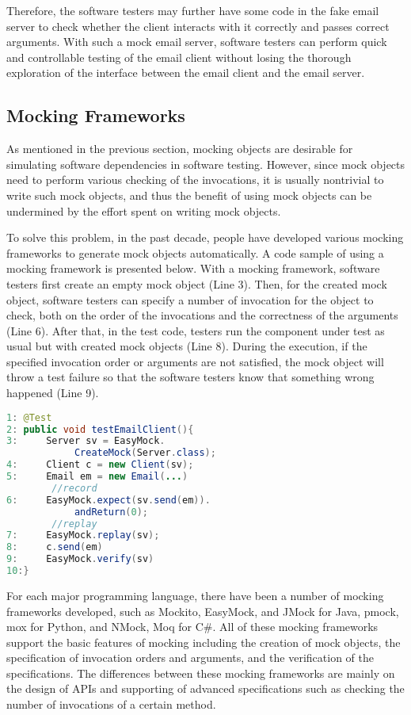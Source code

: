Therefore, the software testers may further have some code in the fake email server to check whether the client interacts with it correctly and passes correct arguments. With such a mock email server, software testers can perform quick and controllable testing of the email client without losing the thorough exploration of the interface between the email client and the email server.


\subsection{Mocking Frameworks}

As mentioned in the previous section, mocking objects are desirable for simulating software dependencies in software testing. However, since mock objects need to perform various checking of the invocations, it is usually nontrivial to write such mock objects, and thus the benefit of using mock objects can be undermined by the effort spent on writing mock objects. 

To solve this problem, in the past decade, people have developed various mocking frameworks to generate mock objects automatically. A code sample of using a mocking framework is presented below. With a mocking framework, software testers first create an empty mock object (Line 3). Then, for the created mock object, software testers can specify a number of invocation for the object to check, both on the order of the invocations and the correctness of the arguments (Line 6). After that, in the test code, testers run the component under test as usual but with created mock objects (Line 8). During the execution, if the specified invocation order or arguments are not satisfied, the mock object will throw a test failure so that the software testers know that something wrong happened (Line 9). \\


\begin{lstlisting}[language=Java]
1: @Test
2: public void testEmailClient(){
3:     Server sv = EasyMock.
            CreateMock(Server.class); 
4:     Client c = new Client(sv);         
5:     Email em = new Email(...)
        //record
6:     EasyMock.expect(sv.send(em)).
            andReturn(0);
        //replay
7:     EasyMock.replay(sv);
8:     c.send(em)
9:     EasyMock.verify(sv)
10:}
\end{lstlisting}


For each major programming language, there have been a number of mocking frameworks developed, such as Mockito, EasyMock, and JMock for Java, pmock, mox for Python, and NMock, Moq for C\#. All of these mocking frameworks support the basic features of mocking including the creation of mock objects, the specification of invocation orders and arguments, and the verification of the specifications. The differences between these mocking frameworks are mainly on the design of APIs and supporting of advanced specifications such as checking the number of invocations of a certain method. 
